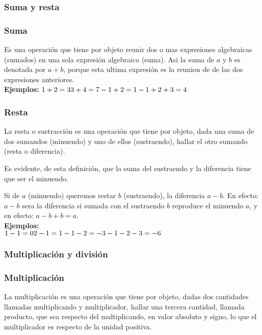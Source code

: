 \subsubsection{Suma y resta}
\subsubsection*{Suma}
Es una operación que tiene por objeto reunir dos o mas expresiones algebraicas (sumados) en una sola expresión algebraica (suma).
Asi la suma de $a$ y $b$ es denotada por $a+b$, porque esta ultima expresión es la reunion de de las dos expresiones anteriores.
\\
\textbf{Ejemplos:}
$
	\\
	1 + 2 = 3\\
	3 + 4 = 7\\
	-1 + 2 = 1\\
	-1 + 2 + 3 = 4
$
\subsubsection*{Resta}

La resta o sustracción es una operación que tiene por objeto, dada una suma de dos sumandos (minuendo) y uno de ellos (sustraendo), hallar el otro sumando (resta o diferencia).

Es evidente, de esta definición, que la suma del sustraendo y la diferencia tiene que ser el minuendo.

Si de $a$ (minuendo) queremos restar $b$ (sustraendo), la diferencia $a - b$. En efecto: $a - b$ sera la diferencia si sumada con el sustraendo $b$ reproduce el minuendo $a$, y en efecto: $a - b + b = a$.
\\
\textbf{Ejemplos:}
\\
$
	1 - 1 = 0\\
	2 - 1 = 1\\
	-1 - 2 = -3\\
	-1 - 2 - 3 = -6
$

\subsubsection{Multiplicación y división}

\subsubsection*{Multiplicación}

La multiplicación es una operación que tiene por objeto, dadas dos cantidades llamadas multiplicando y multiplicador, hallar una tercera cantidad, llamada producto, que sea respecto del multiplicando, en valor absoluto y signo, lo que el multiplicador es respecto de la unidad positiva.

